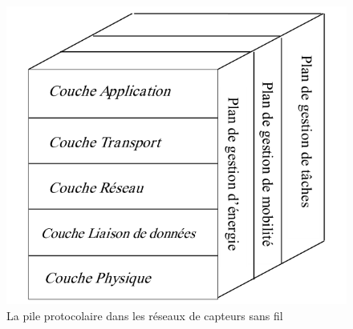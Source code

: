 \begin{figure}[h]
\begin{center}
	\includegraphics[scale=0.6]{Chapitre1/pile.png}
	\caption{La pile protocolaire dans les réseaux de capteurs sans fil}
\end{center}
\end{figure}

